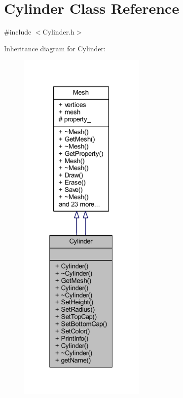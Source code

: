 \hypertarget{class_cylinder}{}\section{Cylinder Class Reference}
\label{class_cylinder}


{\ttfamily \#include $<$Cylinder.\+h$>$}



Inheritance diagram for Cylinder\+:\nopagebreak
\begin{figure}[H]
\begin{center}
\leavevmode
\includegraphics[width=175pt]{class_cylinder__inherit__graph}
\end{center}
\end{figure}


